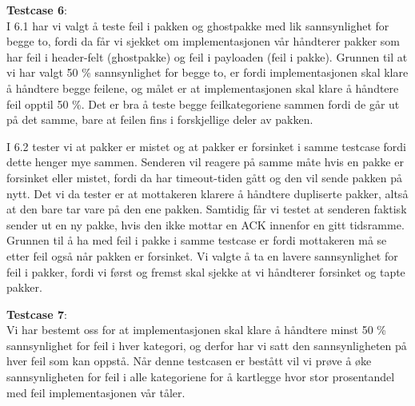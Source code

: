 \textbf{Testcase 6}:\\
I 6.1 har vi valgt å teste feil i pakken og ghostpakke med lik sannsynlighet for begge to, fordi da får vi sjekket om implementasjonen vår håndterer pakker som har feil i header-felt (ghostpakke) og feil i payloaden (feil i pakke). Grunnen til at vi har valgt 50 \% sannsynlighet for begge to, er fordi implementasjonen skal klare å håndtere begge feilene, og målet er at implementasjonen skal klare å håndtere feil opptil 50 \%. Det er bra å teste begge feilkategoriene sammen fordi de går ut på det samme, bare at feilen fins i forskjellige deler av pakken. 

I 6.2 tester vi at pakker er mistet og at pakker er forsinket i samme testcase fordi dette henger mye sammen. Senderen vil reagere på samme måte hvis en pakke er forsinket eller mistet, fordi da har timeout-tiden gått og den vil sende pakken på nytt. Det vi da tester er at mottakeren klarere å håndtere dupliserte pakker, altså at den bare tar vare på den ene pakken. Samtidig får vi testet at senderen faktisk sender ut en ny pakke, hvis den ikke mottar en ACK innenfor en gitt tidsramme. Grunnen til å ha med feil i pakke i samme testcase er fordi mottakeren må se etter feil også når pakken er forsinket. Vi valgte å ta en lavere sannsynlighet for feil i pakker, fordi vi først og fremst skal sjekke at vi håndterer forsinket og tapte pakker.

\textbf{Testcase 7}:\\
Vi har bestemt oss for at implementasjonen skal klare å håndtere minst 50 \% sannsynlighet for feil i hver kategori, og derfor har vi satt den sannsynligheten på hver feil som kan oppstå. Når denne testcasen er bestått vil vi prøve å øke sannsynligheten for feil i alle kategoriene for å kartlegge hvor stor prosentandel med feil implementasjonen vår tåler. 